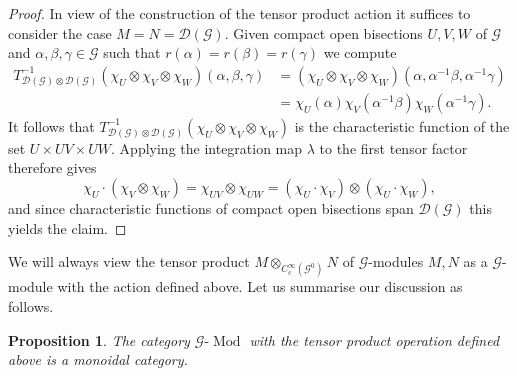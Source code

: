 \documentclass{amsart}
\newtheorem{prop}[thm]{Proposition}
\newcommand{\G}{\mathcal{G}}
\newcommand{\DG}{\mathcal{D}(\mathcal{G})}
\newcommand{\ccinfty}{C_c^\infty}
\begin{document}
\begin{proof}
In view of the construction of the tensor product action it suffices to consider the case $ M = N = \DG $. Given compact open bisections $ U,V,W $ of $ \G $ and  $ \alpha, \beta, \gamma \in \G $ such that $ r(\alpha) = r(\beta) = r(\gamma) $ we compute
\begin{align*}
T^{-1}_{\DG \otimes \DG}(\chi_U\otimes \chi_V\otimes \chi_W)(\alpha,\beta,\gamma) &= (\chi_U\otimes \chi_V\otimes \chi_W)(\alpha,\alpha^{-1}\beta,\alpha^{-1}\gamma)\\
&=\chi_U(\alpha) \chi_V(\alpha^{-1}\beta)\chi_W(\alpha^{-1}\gamma).
\end{align*}
It follows that $ T^{-1}_{\DG \otimes \DG}(\chi_U\otimes \chi_V\otimes \chi_W) $ is the characteristic function of the set $ U \times U V \times UW $. 
Applying the integration map $ \lambda $ to the first tensor factor therefore gives 
$$
\chi_U \cdot (\chi_V \otimes \chi_W) = \chi_{UV} \otimes \chi_{UW} = (\chi_U \cdot \chi_V) \otimes (\chi_U \cdot \chi_W),  
$$
and since characteristic functions of compact open bisections span $ \DG $ this yields the claim. 
\end{proof}

We will always view the tensor product $ M \otimes_{\ccinfty(\G^0)} N $ of $ \G $-modules $ M, N $ as a $ \G $-module with the action defined above. Let us summarise our discussion as follows. 

\begin{prop} \label{tensorcategory}
The category $ \G\mbox{-}\operatorname{Mod} $ with the tensor product operation defined above is a monoidal category.  
\end{prop}
\end{document}
